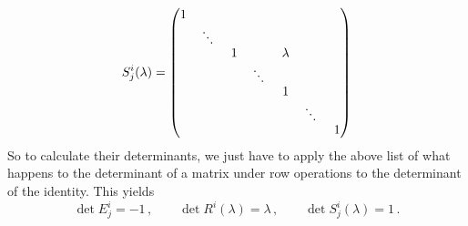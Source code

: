 {\[
S^i_j(\lambda) = \begin{pmatrix}
1 & 	& 	& 	& & & 	\\
  & \rotatebox{-15}{$\ddots$} & 	&	& & &	\\
  & 	& 1 	& 	& \lambda & &	\\
  & 	& 	& \rotatebox{-15}{$\ddots$} & & &	\\
  & 	& 	& 	& 1 & & 	\\
  & 	& 	& 	& 	& \rotatebox{-15}{$\ddots$}& 	\\
  & 	& 	& 	& 	& 	 & 1	\\
\end{pmatrix}
\]
So to calculate their determinants, we just have to apply the above list of what happens to the determinant of a matrix under row operations to the determinant of the identity. This yields
$$
\det E^i_j=-1\, ,\qquad
\det R^i(\lambda)=\lambda\, ,\qquad
\det S^i_j(\lambda)=1\, .
$$


} %

